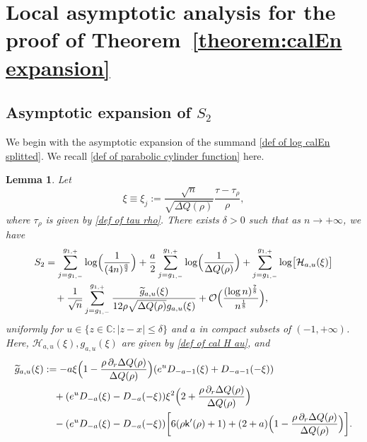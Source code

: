 \documentclass[reqno]{amsart}
\newcommand{\1}{\mathds{1}}
\newcommand{\C}{\mathds{C}}
\numberwithin{equation}{section}
\newtheorem{lemma}[theorem]{Lemma}
\theoremstyle{definition}
\begin{document}
   



\section{Local asymptotic analysis for the proof of Theorem~\ref{theorem:calEn expansion}}
\label{section:local analysis part}
\subsection{Asymptotic expansion of \texorpdfstring{$S_2$}{S_2}}
\label{subsection:local analysis S2}
We begin with the asymptotic expansion of the summand \eqref{def of log calEn splitted}. 
We recall \eqref{def of parabolic cylinder function} here. 
\begin{lemma}\label{lemma:S2in part1}
Let
\begin{equation}
\label{def of xi}
     \xi\equiv\xi_{j}:=\frac{\sqrt{n}}{\sqrt{\Delta Q(\rho)}}\frac{\tau-\tau_{\rho}}{\rho},
\end{equation}
where $\tau_{\rho}$ is given by \eqref{def of tau rho}. 
There exists $\delta>0$ such that as $n\to+\infty$, we have 
\begin{align}
\begin{split}
\label{def of S2 asymptotics part 1}
S_2
&=
\sum_{j=g_{1,-}}^{g_{1,+}}\log\Bigl(\frac{1}{(4n)^{\frac{a}{2}}}\Bigr)
+
\frac{a}{2}\sum_{j=g_{1,-}}^{g_{1,+}}\log\Bigl(\frac{1}{\Delta Q(\rho)}\Bigr)
+
\sum_{j=g_{1,-}}^{g_{1,+}}\log \bigl[\mathcal{H}_{a,u}(\xi)\bigr]
\\
&\quad
+\frac{1}{\sqrt{n}} \sum_{j=g_{1,-}}^{g_{1,+}}\frac{\widetilde{g}_{a,u}(\xi)}{12\rho\sqrt{\Delta Q(\rho)}g_{a,u}(\xi)}
+\mathcal{O}\Bigl(\frac{(\log n)^{\frac{7}{8}}}{n^{\frac{1}{8}}}\Bigr),
\end{split}
\end{align}    
uniformly for $u\in\{z\in\C:|z-x|\leq \delta\}$ and $a$ in compact subsets of $(-1,+\infty)$.
Here, $\mathcal{H}_{a,u}(\xi),g_{a,u}(\xi)$ are given by \eqref{def of cal H au}, and 
\begin{align}
\begin{split}
\label{def of tilde gau}
\widetilde{g}_{a,u}(\xi)&:=
-a\xi\Bigl(1-\frac{\rho\,\partial_r\Delta Q(\rho)}{\Delta Q(\rho)}\Bigr)
(e^{u}D_{-a-1}(\xi)+D_{-a-1}(-\xi))
\\
&\quad
+(e^u D_{-a}(\xi)-D_{-a}(-\xi))
\xi^2\Bigl(2+\frac{\rho\,\partial_r\Delta Q(\rho)}{\Delta Q(\rho)}\Bigr)
\\
&\quad
-(e^u D_{-a}(\xi)-D_{-a}(-\xi))
\bigg[
6(\rho \mathsf{k}'(\rho)+1)+(2+a)\Bigl(1-\frac{\rho\,\partial_r\Delta Q(\rho)}{\Delta Q(\rho)}\Bigr)
\bigg].
\end{split}
\end{align}
\end{lemma}
\end{document}
